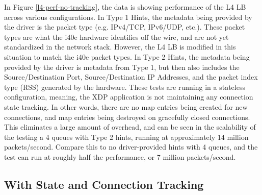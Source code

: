 \documentclass[letterpaper]{article}
\begin{document}
In Figure \ref{l4-perf-no-tracking}, the data is showing performance of the L4 LB across various configurations.
\newline
\newline
In Type 1 Hints, the metadata being provided by the driver is the packet type (e.g. IPv4/TCP, IPv6/UDP, etc.).  These packet types are what the i40e hardware identifies off the wire, and are not yet standardized in the network stack.  However, the L4 LB is modified in this situation to match the i40e packet types.
\newline
\newline
In Type 2 Hints, the metadata being provided by the driver is metadata from Type 1, but then also includes the Source/Destination Port, Source/Destination IP Addresses, and the packet index type (RSS) generated by the hardware.
\newline
\newline
These tests are running in a stateless configuration, meaning, the XDP application is not maintaining any connection state tracking.  In other words, there are no map entries being created for new connections, and map entries being destroyed on gracefully closed connections.  This eliminates a large amount of overhead, and can be seen in the scalability of the testing a 4 queues with Type 2 hints, running at approximately 14 million packets/second.  Compare this to no driver-provided hints with 4 queues, and the test can run at roughly half the performance, or 7 million packets/second.

\subsection{With State and Connection Tracking}
\end{document}
